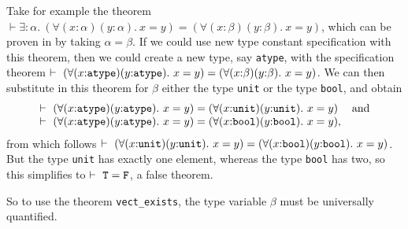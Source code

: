 Take for example the theorem $\vdash \exists{:}\alpha.\ 
(\forall (x{:}\alpha) (y{:}\alpha).\ x = y) =
(\forall (x{:}\beta) (y{:}\beta).\ x = y)$, which can be proven in \HOLW{}
by taking
$\alpha = \beta$.
If we could use new type constant specification with this theorem, then we
could create a new type, say \texttt{atype}, with the specification theorem
$\vdash~(\forall (x{:}\mbox{\tt atype}) (y{:}\mbox{\tt atype}).\ x = y) =
(\forall (x{:}\beta) (y{:}\beta).\ x = y)$.
We can then substitute in this theorem for $\beta$
either the type \texttt{unit} or the type \texttt{bool}, and obtain
\[
\begin{array}{ll}
\vdash~(\forall (x{:}\mbox{\tt atype}) (y{:}\mbox{\tt atype}).\ x = y) =
(\forall (x{:}\mbox{\tt unit}) (y{:}\mbox{\tt unit}).\ x = y) & \mbox{and} \\
\vdash~(\forall (x{:}\mbox{\tt atype}) (y{:}\mbox{\tt atype}).\ x = y) =
(\forall (x{:}\mbox{\tt bool}) (y{:}\mbox{\tt bool}).\ x = y), &
\end{array}
\]
from which follows
$\vdash~(\forall (x{:}\mbox{\tt unit}) (y{:}\mbox{\tt unit}).\ x = y) =
(\forall (x{:}\mbox{\tt bool}) (y{:}\mbox{\tt bool}).\ x = y)$.
But the type \texttt{unit} has exactly one element, whereas the type
\texttt{bool} has two, so this simplifies to $\vdash~\mbox{\tt T} = \mbox{\tt F}$,
a false theorem.

So to use the theorem \texttt{vect\_exists},
the type variable $\beta$ must be universally quantified.

